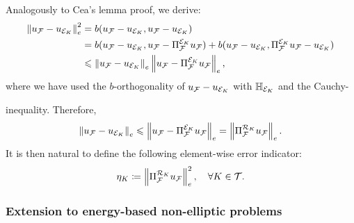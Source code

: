 {{{{Analogously to Cea's lemma proof, we derive:
\begin{align}
  \left\|u_{\mathcal{F}}-u_{\mathcal{E}_K}\right\|_e^2 & = b(u_{\mathcal{F}}-u_{\mathcal{E}_K},u_{\mathcal{F}}-u_{\mathcal{E}_K})                                                                                         \\
                                   & = b(u_{\mathcal{F}}-u_{\mathcal{E}_K},u_{\mathcal{F}}-\Pi_{\mathcal{F}}^{\mathcal{E}_K} u_{\mathcal{F}})+b(u_{\mathcal{F}}-u_{\mathcal{E}_K},\Pi_{\mathcal{F}}^{\mathcal{E}_K}u_{\mathcal{F}}-u_{\mathcal{E}_K}) \\
                                   & \leqslant \left\|u_{\mathcal{F}}-u_{\mathcal{E}_K}\right\|_{e}\left\|u_{\mathcal{F}}-\Pi_{\mathcal{F}}^{\mathcal{E}_K}u_{\mathcal{F}}\right\|_e,
\end{align}
where we have used the $b$-orthogonality of $u_{\mathcal{F}}-u_{\mathcal{E}_K}$ with $\mathbb{H}_{\mathcal{E}_K}$ and the Cauchy-{ inequality. Therefore,
\begin{equation}
  \left\|u_{\mathcal{F}}-u_{\mathcal{E}_K}\right\|_e \leqslant \left\|u_{\mathcal{F}}-\Pi_{\mathcal{F}}^{\mathcal{E}_K} u_{\mathcal{F}}\right\|_e=\left\|\Pi_{\mathcal{F}}^{\mathcal{R}_K} u_{\mathcal{F}}\right\|_e. \label{eq:upperboundSPD}
\end{equation}
It is then natural to define the following element-wise error indicator: %
\begin{equation}
  \eta_K\coloneqq \left\|\Pi_{\mathcal{F}}^{\mathcal{R}_K} u_{\mathcal{F}}\right\|_e^2, \quad \forall K \in \mathcal{T}.\label{eq:SPDindicators}
\end{equation}

\subsubsection{Extension to energy-based non-elliptic problems}

}}}}}
